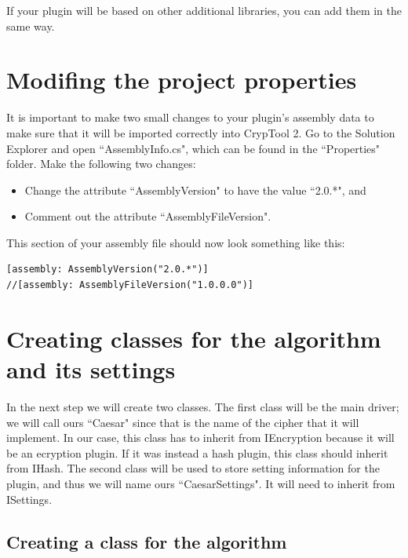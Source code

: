 \noindent If your plugin will be based on other additional libraries, you can add them in the same way.

\section{Modifing the project properties}
\label{sec:ModifyTheProjectProperties}

It is important to make two small changes to your plugin's assembly data to make sure that it will be imported correctly into CrypTool 2. Go to the Solution Explorer and open ``AssemblyInfo.cs", which can be found in the ``Properties" folder. Make the following two changes:

\begin{itemize}
	\item Change the attribute ``AssemblyVersion" to have the value ``2.0.*", and
	\item Comment out the attribute ``AssemblyFileVersion".
\end{itemize}

\noindent This section of your assembly file should now look something like this:

\begin{lstlisting}
[assembly: AssemblyVersion("2.0.*")]
//[assembly: AssemblyFileVersion("1.0.0.0")]
\end{lstlisting}

\section{Creating classes for the algorithm and its settings}
\label{sec:CreatingClassesForTheAlgorithmAndItsSettings}

In the next step we will create two classes. The first class will be the main driver; we will call ours ``Caesar" since that is the name of the cipher that it will implement. In our case, this class has to inherit from IEncryption because it will be an ecryption plugin. If it was instead a hash plugin, this class should inherit from IHash. The second class will be used to store setting information for the plugin, and thus we will name ours ``CaesarSettings". It will need to inherit from ISettings.
\clearpage

\subsection{Creating a class for the algorithm}
\label{sec:CreatingAClassForTheAlgorithm}

